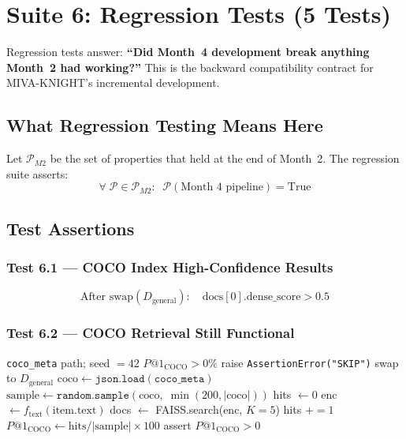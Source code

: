 \documentclass[12pt,a4paper]{article}
\newcounter{mdef}[section]
\newenvironment{mdef}[1][]{%
  \refstepcounter{mdef}%
  \begin{tcolorbox}[mydef, title={Definition~\thesection.\themdef%
    \ifx\relax#1\relax\else\ (#1)\fi}]%
}{\end{tcolorbox}}
\begin{document}
\newpage

\section{Suite 6: Regression Tests (5 Tests)}
\label{sec:regression}

Regression tests answer: \textbf{``Did Month~4 development break anything Month~2 had
working?''} This is the backward compatibility contract for MIVA-KNIGHT's incremental
development.

\subsection{What Regression Testing Means Here}

\begin{mdef}[Backward Compatibility Contract]
Let $\mathcal{P}_{M2}$ be the set of properties that held at the end of Month~2.
The regression suite asserts:
\[
  \forall\; \mathcal{P} \in \mathcal{P}_{M2}:\;\; \mathcal{P}(\text{Month~4 pipeline}) = \text{True}
\]
\end{mdef}

\subsection{Test Assertions}

\subsubsection{Test 6.1 --- COCO Index High-Confidence Results}
\[
  \text{After swap}(D_{\text{general}}):\quad \text{docs}[0].\text{dense\_score} > 0.5
\]

\subsubsection{Test 6.2 --- COCO Retrieval Still Functional}

\begin{algorithm}[H]
\caption{\texttt{test\_coco\_retrieval()} --- COCO P@1 sanity check}
\label{alg:coco-regression}
\begin{algorithmic}[1]
\Require \texttt{coco\_meta} path; seed $= 42$
\Ensure $P@1_{\text{COCO}} > 0\%$
  \State raise \texttt{AssertionError("SKIP")}
\EndIf
\State swap to $D_{\text{general}}$
\State $\text{coco} \gets \texttt{json.load}(\texttt{coco\_meta})$
\State $\text{sample} \gets \texttt{random.sample}(\text{coco},\;\min(200, |\text{coco}|))$
\State hits $\gets 0$
  \State enc $\gets f_{\text{text}}(\text{item.text})$
  \State docs $\gets$ FAISS.search(enc, $K=5$)
   hits $\mathrel{+}= 1$ \EndIf
\EndFor
\State $P@1_{\text{COCO}} \gets \text{hits} / |\text{sample}| \times 100$
\State assert $P@1_{\text{COCO}} > 0$ 
\end{algorithmic}
\end{algorithm}
\end{document}

